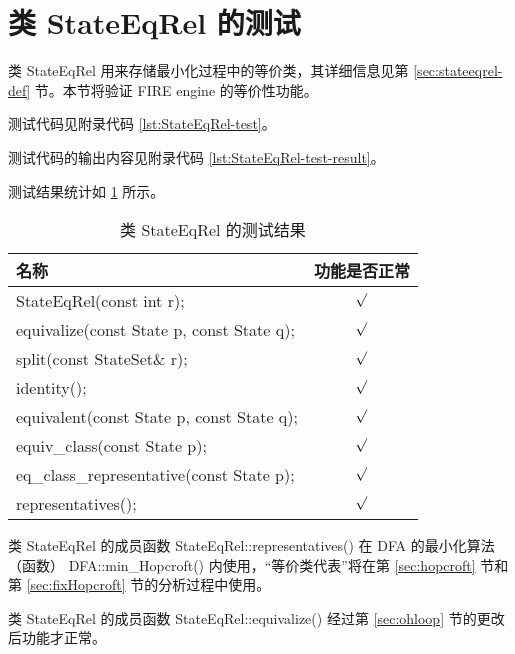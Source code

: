 \section{类 StateEqRel 的测试}\label{sec:test:stateeqrel}

类 StateEqRel 用来存储最小化过程中的等价类，其详细信息见第 \ref{sec:stateeqrel-def} 节。本节将验证 FIRE engine 的等价性功能。

测试代码见附录代码 \ref{lst:StateEqRel-test}。

测试代码的输出内容见附录代码 \ref{lst:StateEqRel-test-result}。

测试结果统计如 \ref{tab:Class-StateEqRel-test-result} 所示。


\begin{table}[!htbp]
    \caption{类 StateEqRel 的测试结果}
    \label{tab:Class-StateEqRel-test-result}
    \centering
    \small%
    \setlength{\tabcolsep}{8pt}%
    \renewcommand{\arraystretch}{1.2}%
        \begin{tabular}{lc} %
        \toprule
        \mbox{\qquad \qquad 名称} & 功能是否正常  \\
        \midrule 
        StateEqRel(const int r); & $\surd$  \\
        equivalize(const State p, const State q); & $\surd$ \\
        split(const StateSet\& r); & $\surd$ \\
        identity(); & $\surd$ \\
        equivalent(const State p, const State q); & $\surd$ \\
        equiv\_class(const State p); & $\surd$ \\
        eq\_class\_representative(const State p); & $\surd$ \\
        representatives(); & $\surd$ \\
        \bottomrule 
    \end{tabular}
\end{table}

\begin{remark}
    类 StateEqRel 的成员函数 StateEqRel::representatives() 在 DFA 的最小化算法（函数） DFA::min\_Hopcroft() 内使用，“等价类代表”将在第 \ref{sec:hopcroft} 节和第 \ref{sec:fixHopcroft} 节的分析过程中使用。
\end{remark}

\begin{remark}
    类 StateEqRel 的成员函数 StateEqRel::equivalize() 经过第 \ref{sec:ohloop} 节的更改后功能才正常。
\end{remark}

